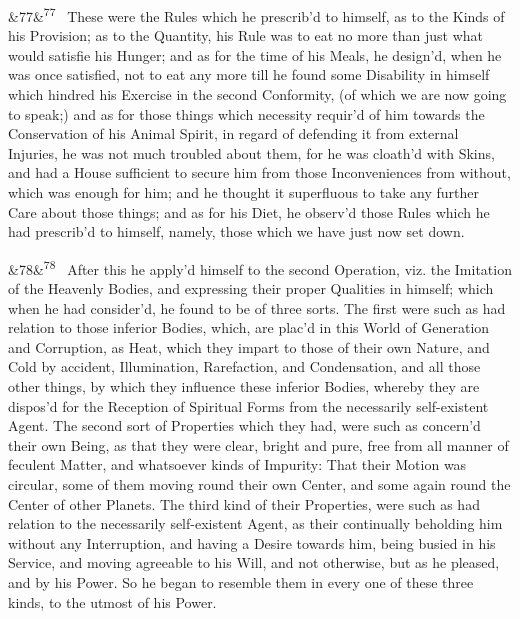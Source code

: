 \documentclass[12pt]{article}
\newcommand{\para}[1][]{\par\noindent\ifx&#1&\else\textsuperscript{\footnotesize #1}~\fi}
\begin{document}
\para[77] These were the Rules which he prescrib'd to himself, as to the Kinds of his Provision; as to the Quantity, his Rule was to eat no more than just what would satisfie his Hunger; and as for the time of his Meals, he design'd, when he was once satisfied, not to eat any more till he found some Disability in himself which hindred his Exercise in the second Conformity, (of which we are now going to speak;) and as for those things which necessity requir'd of him towards the Conservation of his Animal Spirit, in regard of defending it from external Injuries, he was not much troubled about them, for he was cloath'd with Skins, and had a House sufficient to secure him from those Inconveniences from without, which was enough for him; and he thought it superfluous to take any further Care about those things; and as for his Diet, he observ'd those Rules which he had prescrib'd to himself, namely, those which we have just now set down.

\para[78] After this he apply'd himself to the second Operation, viz. the Imitation of the Heavenly Bodies, and expressing their proper Qualities in himself; which when he had consider'd, he found to be of three sorts. The first were such as had relation to those inferior Bodies, which, are plac'd in this World of Generation and Corruption, as Heat, which they impart to those of their own Nature, and Cold by accident, Illumination, Rarefaction, and Condensation, and all those other things, by which they influence these inferior Bodies, whereby they are dispos'd for the Reception of Spiritual Forms from the necessarily self-existent Agent. The second sort of Properties which they had, were such as concern'd their own Being, as that they were clear, bright and pure, free from all manner of feculent Matter, and whatsoever kinds of Impurity: That their Motion was circular, some of them moving round their own Center, and some again round the Center of other Planets. The third kind of their Properties, were such as had relation to the necessarily self-existent Agent, as their continually beholding him without any Interruption, and having a Desire towards him, being busied in his Service, and moving agreeable to his Will, and not otherwise, but as he pleased, and by his Power. So he began to resemble them in every one of these three kinds, to the utmost of his Power.
\end{document}
